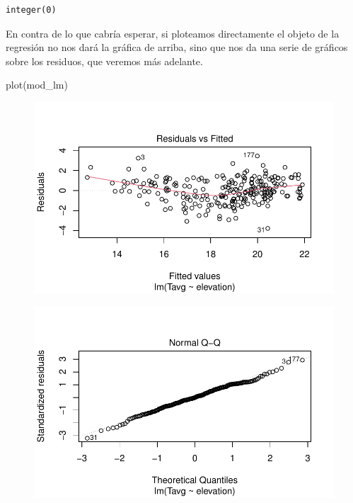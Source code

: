 \documentclass[
  letterpaper,
  DIV=11,
  numbers=noendperiod]{scrreprt}
\newenvironment{Shaded}{\begin{snugshade}}{\end{snugshade}}
\newcommand{\FunctionTok}[1]{\textcolor[rgb]{0.28,0.35,0.67}{#1}}
\newcommand{\NormalTok}[1]{\textcolor[rgb]{0.00,0.23,0.31}{#1}}
\begin{document}
\begin{verbatim}
integer(0)
\end{verbatim}

En contra de lo que cabría esperar, si ploteamos directamente el objeto
de la regresión no nos dará la gráfica de arriba, sino que nos da una
serie de gráficos sobre los residuos, que veremos más adelante.

\begin{Shaded}
\begin{Highlighting}[]
\FunctionTok{plot}\NormalTok{(mod\_lm)}
\end{Highlighting}
\end{Shaded}

\begin{figure}[H]

{\centering \includegraphics{01_RegresionLineal_files/figure-pdf/unnamed-chunk-16-1.pdf}

}

\end{figure}

\begin{figure}[H]

{\centering \includegraphics{01_RegresionLineal_files/figure-pdf/unnamed-chunk-16-2.pdf}

}

\end{figure}
\end{document}
